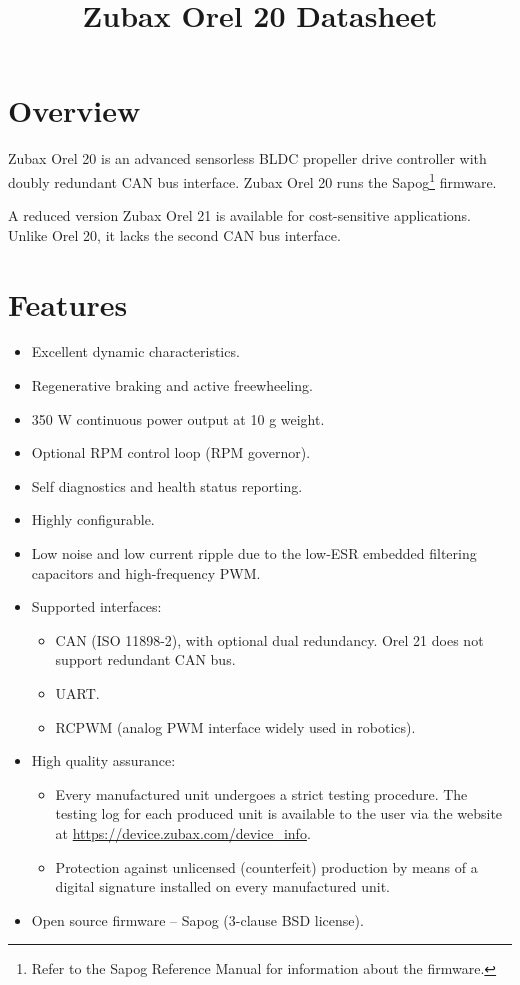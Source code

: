 \documentclass{zubaxdoc}
\title{Zubax Orel 20 Datasheet}
\begin{document}
\frontmatter

\begin{titlepage}

\section*{Overview}

Zubax Orel 20 is an advanced sensorless BLDC propeller drive controller with doubly redundant CAN bus interface.
Zubax Orel 20 runs the Sapog\footnote{Refer to the Sapog Reference Manual for information about the firmware.}
firmware.

A reduced version Zubax Orel 21 is available for cost-sensitive applications.
Unlike Orel 20, it lacks the second CAN bus interface.

\section*{Features}

\begin{itemize}
    \item Excellent dynamic characteristics.
    \item Regenerative braking and active freewheeling.
    \item 350 W continuous power output at 10 g weight.
    \item Optional RPM control loop (RPM governor).
    \item Self diagnostics and health status reporting.
    \item Highly configurable.
    \item Low noise and low current ripple due to the low-\allowbreak{}ESR embedded filtering capacitors and
    high-\allowbreak{}frequency PWM.
    \item Supported interfaces:
    \begin{itemize}
        \item CAN (ISO 11898-2), with optional dual redundancy. Orel 21 does not support redundant CAN bus.
        \item UART.
        \item RCPWM (analog PWM interface widely used in robotics).
    \end{itemize}
    \item High quality assurance:
    \begin{itemize}
        \item Every manufactured unit undergoes a strict testing procedure.
        The testing log for each produced unit is available to the user via the website at
        \url{https://device.zubax.com/device_info}.
        \item Protection against unlicensed (counterfeit) production by means of a digital signature
        installed on every manufactured unit.
    \end{itemize}
    \item Open source firmware -- Sapog (3-clause BSD license).
\end{itemize}


\end{titlepage}
\end{document}
